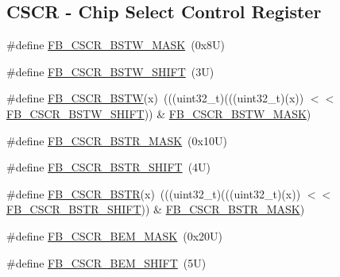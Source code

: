 \subsection*{C\+S\+CR -\/ Chip Select Control Register}
\begin{DoxyCompactItemize}
\item 
\#define \mbox{\hyperlink{group___f_b___register___masks_gaee04052f66392a6242d45c0598b8606a}{F\+B\+\_\+\+C\+S\+C\+R\+\_\+\+B\+S\+T\+W\+\_\+\+M\+A\+SK}}~(0x8\+U)
\item 
\#define \mbox{\hyperlink{group___f_b___register___masks_ga34341b855043b3fbffcad2811084fec8}{F\+B\+\_\+\+C\+S\+C\+R\+\_\+\+B\+S\+T\+W\+\_\+\+S\+H\+I\+FT}}~(3\+U)
\item 
\#define \mbox{\hyperlink{group___f_b___register___masks_gac65009507b4362e43f7b7d112c8a1eec}{F\+B\+\_\+\+C\+S\+C\+R\+\_\+\+B\+S\+TW}}(x)~(((uint32\+\_\+t)(((uint32\+\_\+t)(x)) $<$$<$ \mbox{\hyperlink{group___f_b___register___masks_ga34341b855043b3fbffcad2811084fec8}{F\+B\+\_\+\+C\+S\+C\+R\+\_\+\+B\+S\+T\+W\+\_\+\+S\+H\+I\+FT}})) \& \mbox{\hyperlink{group___f_b___register___masks_gaee04052f66392a6242d45c0598b8606a}{F\+B\+\_\+\+C\+S\+C\+R\+\_\+\+B\+S\+T\+W\+\_\+\+M\+A\+SK}})
\item 
\#define \mbox{\hyperlink{group___f_b___register___masks_gac577e626a579979985c559866c940018}{F\+B\+\_\+\+C\+S\+C\+R\+\_\+\+B\+S\+T\+R\+\_\+\+M\+A\+SK}}~(0x10\+U)
\item 
\#define \mbox{\hyperlink{group___f_b___register___masks_ga161827d21e9f36d9dc4a42a3fc287dd7}{F\+B\+\_\+\+C\+S\+C\+R\+\_\+\+B\+S\+T\+R\+\_\+\+S\+H\+I\+FT}}~(4\+U)
\item 
\#define \mbox{\hyperlink{group___f_b___register___masks_ga19c778185979823e7dd42d969d095d37}{F\+B\+\_\+\+C\+S\+C\+R\+\_\+\+B\+S\+TR}}(x)~(((uint32\+\_\+t)(((uint32\+\_\+t)(x)) $<$$<$ \mbox{\hyperlink{group___f_b___register___masks_ga161827d21e9f36d9dc4a42a3fc287dd7}{F\+B\+\_\+\+C\+S\+C\+R\+\_\+\+B\+S\+T\+R\+\_\+\+S\+H\+I\+FT}})) \& \mbox{\hyperlink{group___f_b___register___masks_gac577e626a579979985c559866c940018}{F\+B\+\_\+\+C\+S\+C\+R\+\_\+\+B\+S\+T\+R\+\_\+\+M\+A\+SK}})
\item 
\#define \mbox{\hyperlink{group___f_b___register___masks_gaef7f70f7c6d39c8e1de2a16ccb4b3ccb}{F\+B\+\_\+\+C\+S\+C\+R\+\_\+\+B\+E\+M\+\_\+\+M\+A\+SK}}~(0x20\+U)
\item 
\#define \mbox{\hyperlink{group___f_b___register___masks_ga2dd3f47a9401af7ae8838b7dc7c379f8}{F\+B\+\_\+\+C\+S\+C\+R\+\_\+\+B\+E\+M\+\_\+\+S\+H\+I\+FT}}~(5\+U)
\item 

\end{DoxyCompactItemize}
